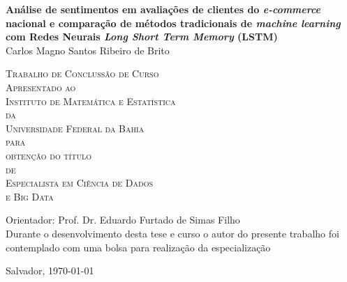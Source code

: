 \documentclass[12pt,a4paper]{article}
\begin{document}


\thispagestyle{empty}
\newcommand{\autor}{Carlos Magno Santos Ribeiro de Brito}
\newcommand{\orientador}{Eduardo Furtado de Simas Filho}
\newcommand{\titulo}{Análise de sentimentos em avaliações de clientes do \textit{e-commerce} nacional e comparação de métodos tradicionais de \textit{machine learning} com Redes Neurais \textit{Long Short Term Memory} (LSTM)}
\begin{center}

    \vspace*{2.3cm}
    \textbf{\Large{\titulo}}\\
    
    \vspace*{1.2cm}
    \Large{\autor}
    
    \vskip 2cm
    \textsc{
        Trabalho de Conclussão de Curso \\[-0.25cm]
        Apresentado ao\\[-0.25cm]
        Instituto de Matemática e Estatística\\[-0.25cm]
        da\\[-0.25cm]
        Universidade Federal da Bahia\\[-0.25cm]
        para\\[-0.25cm]
        obtenção do título\\[-0.25cm]
        de\\[-0.25cm]
        Especialista em Ciência de Dados \\ e Big Data}
    
    \vskip 1.5cm
    Orientador: Prof. Dr. \orientador \\
    
    \vskip 1cm
    \normalsize{Durante o desenvolvimento desta tese e curso o autor do presente trabalho foi contemplado com uma bolsa para realização da especialização}
    
    \vskip 2.5cm
    \normalsize{Salvador, \today}
\end{center}

\end{document}
